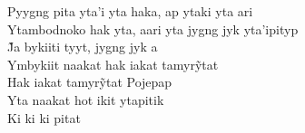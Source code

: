 \begin{linenumbers}\begingroup\raggedright

\noindent   Pyygng pita yta'i yta haka, ap ytaki yta ari\\
  Ytambodnoko hak yta, aari yta jygng jyk yta'ipityp\\
  J̃a bykiiti tyyt, jygng jyk a\\
  Ymbykiit naakat hak iakat tamyrỹtat\\
  Hak iakat tamyrỹtat Pojepap\\
  Yta naakat hot ikit ytapitik\\
  Ki ki ki pitat

\end{linenumbers}\endgroup

\bigskip

